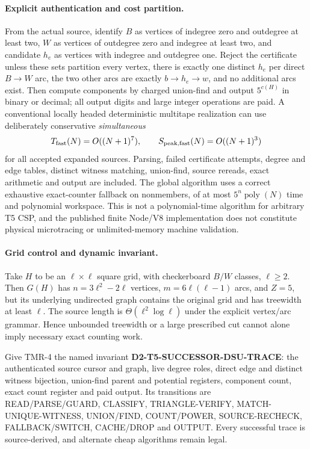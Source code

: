 \documentclass[11pt]{article}
\begin{document}
\paragraph{Explicit authentication and cost partition.}
From the actual source, identify $B$ as vertices of
indegree zero and outdegree at least two, $W$ as
vertices of outdegree zero and indegree at least two,
and candidate $h_e$ as vertices with indegree and
outdegree one. Reject the certificate unless these
sets partition every vertex, there is exactly one
distinct $h_e$ per direct $B\to W$ arc, the two
other arcs are exactly $b\to h_e\to w$, and
no additional arcs exist. Then compute components
by charged union-find and output $5^{c(H)}$
in binary or decimal; all output digits and large
integer operations are paid. A conventional
locally headed deterministic multitape realization
can use deliberately conservative \emph{simultaneous}
\[
 T_{\rm fast}(N)=O((N+1)^7),\qquad
 S_{\rm peak,fast}(N)=O((N+1)^3)
\]
for all accepted expanded sources. Parsing, failed
certificate attempts, degree and edge tables, distinct
witness matching, union-find, source rereads, exact
arithmetic and output are included. The global
algorithm uses a correct exhaustive exact-counter
fallback on nonmembers, of at most
$5^n\operatorname{poly}(N)$ time and polynomial
workspace. This is not a polynomial-time algorithm
for arbitrary T5 CSP, and the published finite
Node/V8 implementation does not constitute physical
microtracing or unlimited-memory machine validation.

\paragraph{Grid control and dynamic invariant.}
Take $H$ to be an $\ell\times\ell$ square grid,
with checkerboard $B/W$ classes, $\ell\ge2$.
Then $G(H)$ has
$n=3\ell^2-2\ell$ vertices,
$m=6\ell(\ell-1)$ arcs, and
$Z=5$, but its underlying undirected graph contains
the original grid and has treewidth at least $\ell$.
The source length is $\Theta(\ell^2\log\ell)$
under the explicit vertex/arc grammar. Hence
unbounded treewidth or a large prescribed cut
cannot alone imply necessary exact counting work.

Give TMR-4 the named invariant
\textbf{D2-T5-SUCCESSOR-DSU-TRACE}: the authenticated
source cursor and graph, live degree roles, direct
edge and distinct witness bijection, union-find parent
and potential registers, component count, exact count
register and paid output. Its transitions are
READ/PARSE/GUARD, CLASSIFY, TRIANGLE-VERIFY,
MATCH-UNIQUE-WITNESS, UNION/FIND, COUNT/POWER,
SOURCE-RECHECK, FALLBACK/SWITCH, CACHE/DROP and
OUTPUT. Every successful trace is source-derived,
and alternate cheap algorithms remain legal.
\end{document}
